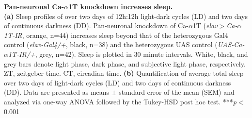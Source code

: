 \label{fig:5}
\textbf{Pan-neuronal Ca-$\alpha$1T knockdown increases sleep.}
\\
\textbf{(a)} Sleep profiles of over two days of 12h:12h light-dark cycles (LD) and two days of continuous darkness (DD). Pan-neuronal knockdown of Ca-$\alpha$1T (\emph{elav$>$Ca-$\alpha$1T-IR}, orange, n=44) increases sleep beyond that of the heterozygous Gal4 control (\emph{elav-Gal4/+}, black, n=38) and the heterozygous UAS control (\emph{UAS-Ca-$\alpha$1T-IR/+}, grey, n=42).
Sleep is plotted in 30 minute intervals.
White, black, and grey bars denote light phase, dark phase, and subjective light phase, respectively.
ZT, zeitgeber time.
CT, circadian time.
\textbf{(b)} Quantification of average total sleep over two days of light-dark cycles (LD) and two days of continuous darkness (DD).
Data are presented as means $\pm$ standard error of the mean (SEM) and analyzed via one-way ANOVA followed by the Tukey-HSD post hoc test.
***\emph{p}$<$0.001
